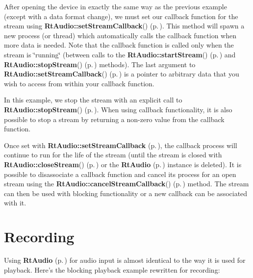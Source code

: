 After opening the device in exactly the same way as the previous example (except with a data format change), we must set our callback function for the stream using {\bf Rt\-Audio::set\-Stream\-Callback}() {\rm (p.\,\pageref{classRtAudio_a4})}. This method will spawn a new process (or thread) which automatically calls the callback function when more data is needed. Note that the callback function is called only when the stream is \char`\"{}running\char`\"{} (between calls to the {\bf Rt\-Audio::start\-Stream}() {\rm (p.\,\pageref{classRtAudio_a11})} and {\bf Rt\-Audio::stop\-Stream}() {\rm (p.\,\pageref{classRtAudio_a12})} methods). The last argument to {\bf Rt\-Audio::set\-Stream\-Callback}() {\rm (p.\,\pageref{classRtAudio_a4})} is a pointer to arbitrary data that you wish to access from within your callback function.

In this example, we stop the stream with an explicit call to {\bf Rt\-Audio::stop\-Stream}() {\rm (p.\,\pageref{classRtAudio_a12})}. When using callback functionality, it is also possible to stop a stream by returning a non-zero value from the callback function.

Once set with {\bf Rt\-Audio::set\-Stream\-Callback} {\rm (p.\,\pageref{classRtAudio_a4})}, the callback process will continue to run for the life of the stream (until the stream is closed with {\bf Rt\-Audio::close\-Stream}() {\rm (p.\,\pageref{classRtAudio_a10})} or the {\bf Rt\-Audio} {\rm (p.\,\pageref{classRtAudio})} instance is deleted). It is possible to disassociate a callback function and cancel its process for an open stream using the {\bf Rt\-Audio::cancel\-Stream\-Callback}() {\rm (p.\,\pageref{classRtAudio_a5})} method. The stream can then be used with blocking functionality or a new callback can be associated with it.

\section{Recording}\label{recording}


Using {\bf Rt\-Audio} {\rm (p.\,\pageref{classRtAudio})} for audio input is almost identical to the way it is used for playback. Here's the blocking playback example rewritten for recording:

